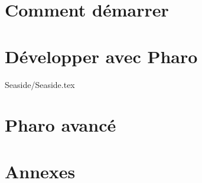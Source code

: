 \documentclass[a4paper,10pt,twoside]{book}
\begin{document}
\part{Comment démarrer}
\pagestyle{headings}




\part{D\'evelopper avec Pharo}







{Seaside/Seaside.tex} %
\part{Pharo avanc\'e}


\appendix
\part{Annexes}

\pagestyle{newheadings}


\cleardoublepage
{\small\raggedright\printindex}
\newcommand{\pagefinale}{\cleardoublepage\thispagestyle{empty}
~ %
}
\pagefinale %
\cleardoublepage
\end{document}
